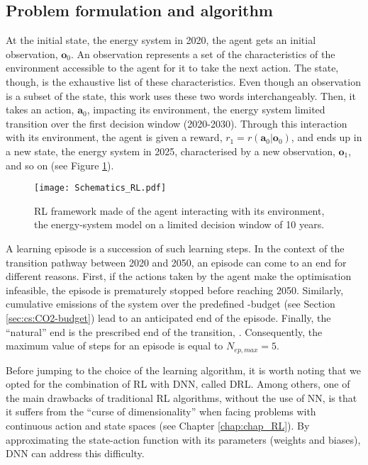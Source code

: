 \subsection{Problem formulation and algorithm}
\label{subsec:meth_RL_algo}
At the initial state, \ie the energy system in 2020, the agent gets an initial observation, $\bm{o}_0$. An observation represents a set of the characteristics of the environment accessible to the agent for it to take the next action. The state, though, is the exhaustive list of these characteristics. Even though an observation is a subset of the state, this work uses these two words interchangeably. Then, it takes an action, $\bm{a}_0$, impacting its environment, \ie the energy system limited transition over the first decision window (2020-2030). Through this interaction with its environment, the agent is given a reward, $r_1=r\left(\bm{a}_0 | \bm{o}_0 \right)$, and ends up in a new state, \ie the energy system in 2025, characterised by a new observation, $\bm{o}_1$, and so on (see Figure \ref{fig:Schematics_RL}).


\begin{figure}[!htbp]
\centering
\texttt{[image: Schematics\_RL.pdf]}
\caption{\Acrfull{RL} framework made of the agent interacting with its environment, \ie the energy-system model on a limited decision window of 10 years.}
\label{fig:Schematics_RL}
\end{figure}

A learning episode is a succession of such learning steps. In the context of the transition pathway between 2020 and 2050, an episode can come to an end for different reasons. First, if the actions taken by the agent make the optimisation infeasible, the episode is prematurely stopped before reaching 2050. Similarly, cumulative emissions of the system over the predefined -budget (see Section \ref{sec:cs:CO2-budget}) lead to an anticipated end of the episode. Finally, the ``natural'' end is the prescribed end of the transition, . Consequently, the maximum value of steps for an episode is equal to $N_{ep,max}=5$. 

Before jumping to the choice of the learning algorithm, it is worth noting that we opted for the combination of \gls{RL} with \gls{DNN}, called \gls{DRL}. Among others, one of the main drawbacks of traditional \gls{RL} algorithms, \ie without the use of \gls{NN},  is that it suffers from the ``curse of dimensionality'' when facing problems with continuous action and state spaces (see Chapter \ref{chap:chap_RL}). By approximating the state-action function with its parameters (\ie weights and biases), \gls{DNN} can address this difficulty. 

